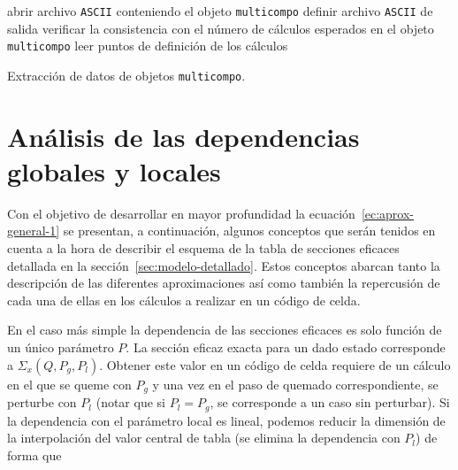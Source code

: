 \documentclass[11pt]{article}
\begin{document}
\medskip
\begin{algorithm}[H]
 
 
 abrir archivo \texttt{ASCII} conteniendo el objeto \texttt{multicompo}\;
 definir archivo \texttt{ASCII} de salida\;
 verificar la consistencia con el número de cálculos esperados en el objeto \texttt{multicompo}\;
 leer puntos de definición de los cálculos\;
 
 \caption{Extracción de datos de objetos \texttt{multicompo}.\label{algo:multicompo-extractor}}
\end{algorithm}
\medskip

\section{Análisis de las dependencias globales y locales}
\label{sec:dependencias-globales-locales}

Con el objetivo de desarrollar en mayor profundidad la ecuación~\ref{ec:aprox-general-1} se presentan, a continuación, algunos conceptos que serán tenidos en cuenta a la hora de describir el esquema de la tabla de secciones eficaces detallada en la sección~\ref{sec:modelo-detallado}. Estos conceptos abarcan tanto la descripción de las diferentes aproximaciones así como también la repercusión de cada una de ellas en los cálculos a realizar en un código de celda.

En el caso más simple la dependencia de las secciones eficaces es solo función de un único parámetro $P$. La sección eficaz exacta para un dado estado corresponde a $\Sigma_x \left( Q, P_g, P_l \right)$. Obtener este valor en un código de celda requiere de un cálculo en el que se queme con $P_g$ y una vez en el paso de quemado correspondiente, se perturbe con $P_l$ (notar que si $P_l = P_g$, se corresponde a un caso sin perturbar). Si la dependencia con el parámetro local es lineal, podemos reducir la dimensión de la interpolación del valor central de tabla (se elimina la dependencia con $P_l$) de forma que 
\end{document}
